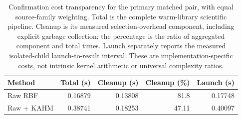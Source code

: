 \begin{table}[t]
\centering\small\setlength{\tabcolsep}{4pt}
\caption{Confirmation cost transparency for the primary matched pair, with equal source-family weighting. Total is the complete warm-library scientific pipeline. Cleanup is its measured selection-overhead component, including explicit garbage collection; the percentage is the ratio of aggregated component and total times. Launch separately reports the measured isolated-child launch-to-result interval. These are implementation-specific costs, not intrinsic kernel arithmetic or universal complexity ratios.}\label{tab:cleanup-costs}
\begin{tabular}{lrrrr}
\toprule
Method & Total (s) & Cleanup (s) & Cleanup (\%) & Launch (s) \\
\midrule
Raw RBF & 0.16879 & 0.13808 & 81.8 & 0.17748 \\
Raw + KAHM & 0.38741 & 0.18253 & 47.11 & 0.40097 \\
\bottomrule
\end{tabular}
\end{table}
